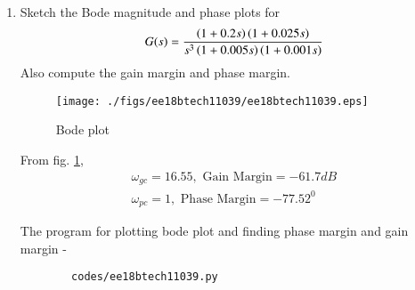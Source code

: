 \begin{enumerate}[label=\thesubsection.\arabic*.,ref=\thesubsection.\theenumi]
    
    \item Sketch the Bode magnitude and phase plots for 
    \begin{align}
        G(s) = \frac{\left(1+0.2s\right)\left(1+0.025s\right)}{s^3\left(1+0.005s\right)\left(1+0.001s\right)}
    \end{align}
    Also compute the gain margin and phase margin.\\
    \solution
    
    \begin{figure}[!h]
    \centering
      \texttt{[image: ./figs/ee18btech11039/ee18btech11039.eps]}
      \caption{Bode plot}
      \label{fig:ee18btech11039}
    \end{figure}
    
    From fig. \ref{fig:ee18btech11039},
    \begin{align}
        \omega_{gc} = 16.55, \text{ Gain Margin} = -61.7 dB \\
        \omega_{pc} = 1, \text{ Phase Margin} = -77.52^0
    \end{align}
    
    The program for plotting bode plot and finding phase margin and gain margin -
    \begin{lstlisting}
        codes/ee18btech11039.py
    \end{lstlisting}
    
    \end{enumerate}
    
    